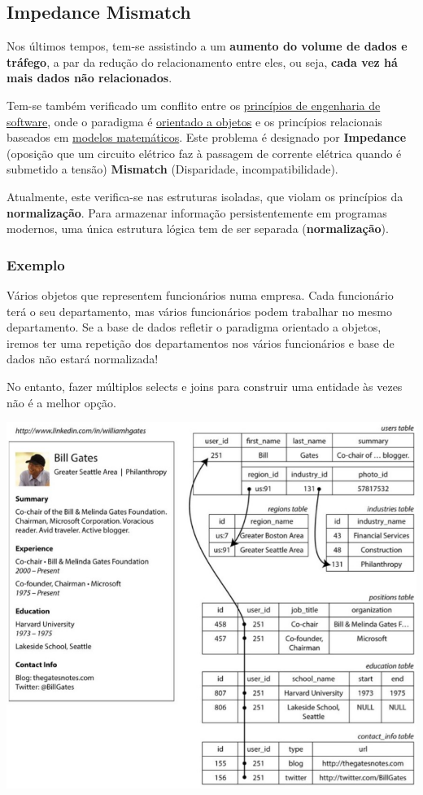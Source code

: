 \documentclass{article}
\begin{document}
\subsection{Impedance Mismatch}

Nos últimos tempos, tem-se assistindo a um \textbf{aumento do volume de dados e tráfego}, a par da
redução do relacionamento entre eles, ou seja, \textbf{cada vez há mais dados não relacionados}.

Tem-se também verificado um conflito entre os \uline{princípios de engenharia de
software}, onde o
paradigma é \uline{orientado a objetos} e os princípios relacionais baseados em \uline{modelos
matemáticos}. Este problema é designado por \textbf{Impedance} (oposição que um circuito elétrico faz à passagem de corrente elétrica quando é submetido a tensão)
\textbf{Mismatch} (Disparidade, incompatibilidade).

Atualmente, este verifica-se nas estruturas isoladas, que violam os princípios da \textbf{normalização}.
Para armazenar informação persistentemente em programas modernos, uma única
estrutura lógica tem de ser separada (\textbf{normalização}).

\subsubsection{Exemplo}

Vários objetos que representem funcionários numa empresa. Cada funcionário terá o seu departamento,
mas vários funcionários podem trabalhar no mesmo departamento. Se a base de dados refletir o paradigma orientado a
objetos, iremos ter uma repetição dos departamentos nos vários funcionários e base de dados não estará normalizada!

No entanto, fazer múltiplos selects e joins para construir uma entidade às vezes não é a melhor opção.

\begin{center}
  \includegraphics[scale=0.3]{4}
\end{center}
\end{document}

